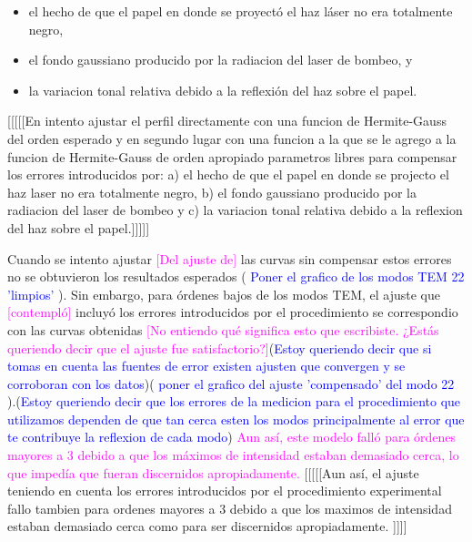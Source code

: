 \documentclass[10pt, a4paper]{article}%
\begin{document}
\begin{multicols}{2}
{\begin{itemize}
    \item el hecho de que el papel en donde se proyectó el haz láser no era totalmente negro,
    \item el fondo gaussiano producido por la radiacion del laser de bombeo, y
    \item la variacion tonal relativa debido a la reflexión del haz sobre el papel.
\end{itemize}
}

[[[[[En intento ajustar el perfil directamente con una funcion de Hermite-Gauss del orden esperado y en segundo lugar con una funcion a la que se le agrego a la funcion de Hermite-Gauss de orden apropiado parametros libres para compensar los errores introducidos por: a) el hecho de que el papel en donde se projecto el haz laser no era totalmente negro, b) el fondo gaussiano producido por la radiacion del laser de bombeo y c) la variacion tonal relativa debido a la reflexion del haz sobre el papel.]]]]]

Cuando se intento ajustar \textcolor{magenta}{[Del ajuste de]} las curvas sin compensar estos errores no se obtuvieron los resultados esperados (\textcolor{Blue}{ Poner el grafico de los modos TEM 22 'limpios' }). Sin embargo, para órdenes bajos de los modos TEM, el ajuste que \textcolor{magenta}{[contempló]} incluyó los errores introducidos por el procedimiento se correspondio con las curvas obtenidas \textcolor{magenta}{[No entiendo qué significa esto que escribiste. ¿Estás queriendo decir que el ajuste fue satisfactorio?]}(\textcolor{Blue}{Estoy queriendo decir que si tomas en cuenta las fuentes de error existen ajusten que convergen y se corroboran con los datos})(\textcolor{Blue}{ poner el grafico del ajuste 'compensado' del modo 22 }).(\textcolor{Blue}{Estoy queriendo decir que los errores de la medicion para el procedimiento que utilizamos dependen de que tan cerca esten los modos principalmente al error que te contribuye la reflexion de cada modo}) 
\textcolor{magenta}{Aun así, este modelo falló para órdenes mayores a 3 debido a que los máximos de intensidad estaban demasiado cerca, lo que impedía que fueran discernidos apropiadamente.}
[[[[[Aun así, el ajuste teniendo en cuenta los errores introducidos por el procedimiento experimental fallo tambien para ordenes mayores a 3 debido a que los maximos de intensidad estaban demasiado cerca como para ser discernidos apropiadamente. ]]]]


\end{multicols}
\end{document}
